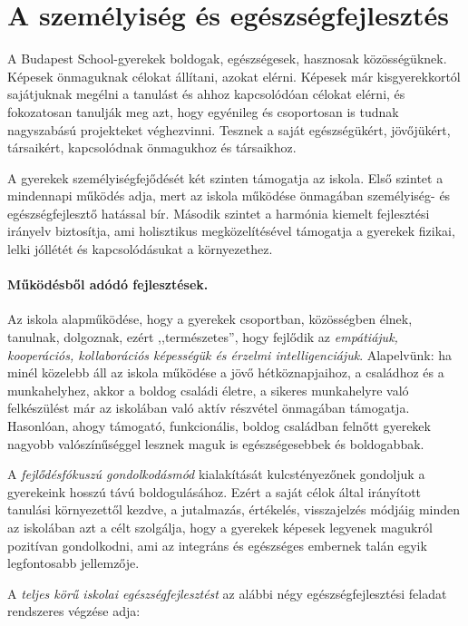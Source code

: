 \section{A személyiség és egészségfejlesztés}
\label{sec:szemilyesegfejlesztes}

A Budapest School-gyerekek boldogak, egészségesek, hasznosak közösségüknek. Képesek önmaguknak célokat állítani, azokat elérni. Képesek  már kisgyerekkortól sajátjuknak megélni a tanulást és ahhoz kapcsolódóan célokat elérni, és fokozatosan tanulják meg azt, hogy egyénileg és csoportosan is tudnak nagyszabású projekteket véghezvinni. Tesznek a saját egészségükért, jövőjükért, társaikért, kapcsolódnak önmagukhoz és társaikhoz.

A gyerekek személyiségfejődését két szinten támogatja az iskola. Első szintet a mindennapi működés adja, mert az iskola működése önmagában személyiség- és egészségfejlesztő hatással bír. Második szintet a harmónia kiemelt fejlesztési irányelv biztosítja, ami holisztikus megközelítésével támogatja a gyerekek fizikai, lelki jóllétét és kapcsolódásukat a
környezethez.

\paragraph{Működésből adódó fejlesztések.}
Az iskola alapműködése, hogy a gyerekek csoportban, közösségben élnek, tanulnak, dolgoznak, ezért ,,természetes'', hogy fejlődik az \emph{empátiájuk, kooperációs, kollaborációs képességük és érzelmi intelligenciájuk}. Alapelvünk: ha minél közelebb áll az iskola működése a jövő hétköznapjaihoz, a családhoz és a munkahelyhez, akkor a boldog családi életre, a sikeres munkahelyre való felkészülést már az iskolában való aktív részvétel önmagában támogatja. Hasonlóan, ahogy támogató, funkcionális, boldog családban felnőtt gyerekek nagyobb valószínűséggel lesznek maguk is egészségesebbek és boldogabbak.

A \emph{fejlődésfókuszú gondolkodásmód} kialakítását  kulcstényezőnek gondoljuk a gyerekeink hosszú távú boldogulásához. Ezért a saját célok által irányított tanulási környezettől kezdve, a jutalmazás, értékelés, visszajelzés módjáig minden az iskolában azt a célt szolgálja, hogy a gyerekek képesek legyenek magukról pozitívan gondolkodni, ami az integráns és egészséges embernek talán egyik legfontosabb jellemzője.

A \emph{teljes körű iskolai egészségfejlesztést} az alábbi négy egészségfejlesztési feladat rendszeres végzése adja:

